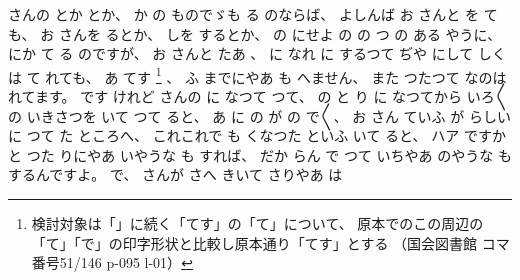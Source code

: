 さんの
とか
とか、
%
か
の
ものでゞも
る
のならば、
%
よしんば
お
さんと
を
ても、
%
お
さんを
るとか、
%
しを
するとか、
%
の
にせよ
の
%
の
つ
の
ある
やうに、
%
にか
て
る
のですが、
%
お
さんと
たあ
、
%
に
なれ
に
するつて
ぢや
にして
しくは
て
れても、
%
あ
てす
\footnote{%
検討対象は「」に続く「てす」の「て」について、
原本でのこの周辺の「て」「で」の印字形状と比較し原本通り「てす」とする
（国会図書館 コマ番号51/146 p-095 l-01）
}%
、
%
ふ
までにやあ
も
へません、
%
また
つたつて
なのは
れてます。
%
です
けれど
さんの
に
なつて
つて、
%
の
と
り
に
なつてから
いろ〳〵の
いきさつを
いて
つて
ると、
%
あ
に
の
が
の
で〳〵、
%
お
さん
ていふ
が
%
らしい
に
つて
た
ところへ、
%
これこれで%
も
くなつた
といふ
いて
ると、
ハア
ですかと
つた
りにやあ
いやうな
も
すれば、
%
だか
らん
で
つて
いちやあ
のやうな
も
するんですよ。
%
で、
%
さんが
さへ
きいて
さりやあ
は
